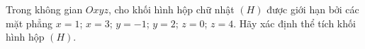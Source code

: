 \begin{ex}
Trong không gian $Oxyz$, cho khối hình hộp chữ nhật $(H)$ được giới hạn bởi các mặt phẳng $x=1$; $x=3$; $y=-1$; $y=2$; $z=0$; $z=4$. Hãy xác định thể tích khối hình hộp $(H)$.
\end{ex}

